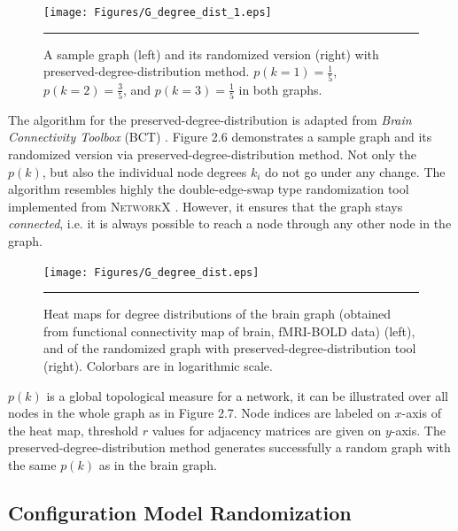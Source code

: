 \begin{figure}[htbp]
  \centering
	\texttt{[image: Figures/G\_degree\_dist\_1.eps]}  
    \rule{35em}{0.5pt}
  \caption[Degree Distribution 2D Example]{A sample graph (left) and its randomized version (right) with preserved-degree-distribution method. $p(k=1)=\frac{1}{5}$, $p(k=2)=\frac{3}{5}$, and $p(k=3)=\frac{1}{5}$ in both graphs. }
  \label{fig:Degree Distribution 2D Example}
\end{figure}

The algorithm for the preserved-degree-distribution is adapted from \textit{Brain Connectivity Toolbox} (\textsc{BCT}) \citep{XYZBCT}. Figure 2.6 demonstrates a sample graph and its randomized version via preserved-degree-distribution method. Not only the $p(k)$, but also the individual node degrees $k_{i}$ do not go under any change.  The algorithm resembles highly the double-edge-swap type randomization tool implemented from \textsc{NetworkX} \citep{XYZNETW}. However, it ensures that the graph stays \textit{connected}, i.e. it is always possible to reach a node through any other node in the graph. 

\begin{figure}[htbp]
  \centering
	\texttt{[image: Figures/G\_degree\_dist.eps]}  
    \rule{35em}{0.5pt}
  \caption[Degree Distribution 3D Example]{Heat maps for degree distributions of the brain graph (obtained from functional connectivity map of brain, fMRI-BOLD data) (left), and of the randomized graph with preserved-degree-distribution tool (right). Colorbars are in logarithmic scale.}
  \label{fig:Degree Distribution 3D Example}
\end{figure}

$p(k)$ is a global topological measure for a network, it can be illustrated over all nodes in the whole graph as in Figure 2.7. Node indices are labeled on $x$-axis of the heat map, threshold $r$ values for adjacency matrices are given on $y$-axis. The preserved-degree-distribution method generates successfully a random graph with the same $p(k)$ as in the brain graph. 


\subsection{Configuration Model Randomization}

